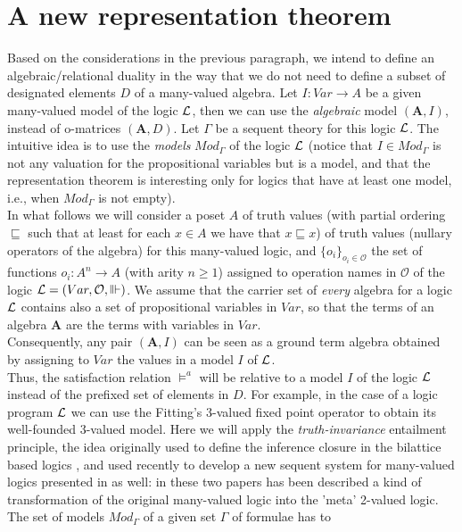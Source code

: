 \documentclass[10pt,twocolumn]{article}
\renewcommand{\O}{\mathcal{O}} \renewcommand{\P}{\mathcal{P}}
\begin{document}
\section{A new representation theorem}
Based on the considerations in the previous paragraph, we intend to
define an algebraic/relational duality in the way that we do not
need to  define a subset of designated elements $D$ of a many-valued
algebra. Let $I:Var \rightarrow A$ be a given many-valued model of
the logic $\mathcal{L}$, then we can use the \emph{algebraic} model
$(\textbf{A},I)$, instead of o-matrices $(\textbf{A},D)$. Let
$\Gamma$ be a sequent theory for this logic $\mathcal{L}$. The intuitive idea
is to use the \emph{models} $Mod_{\Gamma}$ of the logic $\mathcal{L}$ (notice
that $I \in Mod_{\Gamma}$ is not any valuation for the propositional
variables but is a model, and that the representation theorem is
interesting only for logics that have at least one model, i.e.,
when $Mod_{\Gamma}$ is not empty).\\
In what follows we will consider a poset $A$  of truth values (with
partial ordering $\sqsubseteq$ such that at least for each $x \in A$
we have that $x \sqsubseteq x$) of truth values (nullary operators
of the algebra) for this many-valued logic, and $\{o_i\}_{o_i \in
\O}$ the set of functions $o_i:A^n \rightarrow A$ (with arity $n\geq
1$) assigned to operation names in $\O$ of the logic $\L = (Var, \O,
\Vvdash)$.
 We assume  that the
carrier set of \emph{every} algebra for a logic $\mathcal{L}$ contains also a
set of propositional variables in $Var$, so that the terms of an
algebra $\textbf{A}$ are the terms with variables in $Var$.\\
Consequently, any pair $(\textbf{A},I)$ can be seen as a ground term
algebra
obtained by assigning to $Var$ the values in a model $I$ of $\mathcal{L}$.\\
Thus, the satisfaction relation $\models^a$ will be relative to a
model $I$ of the logic $\mathcal{L}$ instead of the prefixed set of elements
in $D$. For example, in the case of a  logic program $\mathcal{L}$ we can use
the Fitting's 3-valued fixed point operator to obtain its
well-founded 3-valued model. Here we will apply the
\emph{truth-invariance} entailment principle, the idea originally
used to define the inference closure in the bilattice based logics
\cite{MajkC04}, and used recently to develop a new  sequent system
for many-valued logics presented in \cite{Majk09BS} as well: in
these two papers has been described a kind of transformation of the
original many-valued logic into the 'meta' 2-valued logic. The set
of models $Mod_{\Gamma}$ of a given set $\Gamma$ of formulae has to
\end{document}
